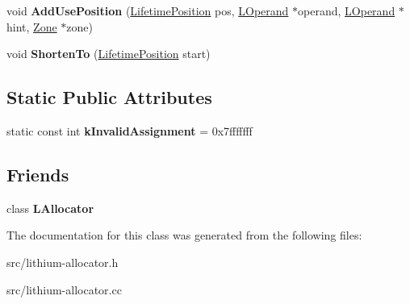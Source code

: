 \begin{DoxyCompactItemize}
\item 
\hypertarget{classv8_1_1internal_1_1_live_range_aff7ace7f236d62b16dca0741aa0be868}{}void {\bfseries Add\+Use\+Position} (\hyperlink{classv8_1_1internal_1_1_lifetime_position}{Lifetime\+Position} pos, \hyperlink{classv8_1_1internal_1_1_l_operand}{L\+Operand} $\ast$operand, \hyperlink{classv8_1_1internal_1_1_l_operand}{L\+Operand} $\ast$hint, \hyperlink{classv8_1_1internal_1_1_zone}{Zone} $\ast$zone)\label{classv8_1_1internal_1_1_live_range_aff7ace7f236d62b16dca0741aa0be868}

\item 
\hypertarget{classv8_1_1internal_1_1_live_range_a16d6deef300ff836d863a53f91350568}{}void {\bfseries Shorten\+To} (\hyperlink{classv8_1_1internal_1_1_lifetime_position}{Lifetime\+Position} start)\label{classv8_1_1internal_1_1_live_range_a16d6deef300ff836d863a53f91350568}

\end{DoxyCompactItemize}
\subsection*{Static Public Attributes}
\begin{DoxyCompactItemize}
\item 
\hypertarget{classv8_1_1internal_1_1_live_range_a4885d99de0dd32127dd111b64a284891}{}static const int {\bfseries k\+Invalid\+Assignment} = 0x7fffffff\label{classv8_1_1internal_1_1_live_range_a4885d99de0dd32127dd111b64a284891}

\end{DoxyCompactItemize}
\subsection*{Friends}
\begin{DoxyCompactItemize}
\item 
\hypertarget{classv8_1_1internal_1_1_live_range_a03aab58a5f603779841a2e424ef17d75}{}class {\bfseries L\+Allocator}\label{classv8_1_1internal_1_1_live_range_a03aab58a5f603779841a2e424ef17d75}

\end{DoxyCompactItemize}


The documentation for this class was generated from the following files\+:\begin{DoxyCompactItemize}
\item 
src/lithium-\/allocator.\+h\item 
src/lithium-\/allocator.\+cc\end{DoxyCompactItemize}
